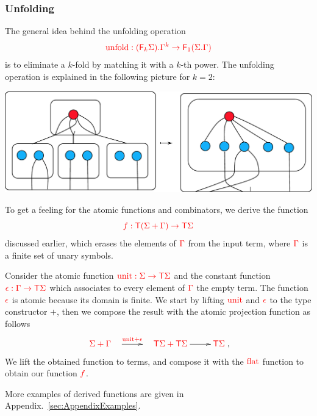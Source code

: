\subsubsection{Unfolding}
The general idea behind the  unfolding operation 
\begin{align*}
{\color{red}{
    {\color{red}{\mathrm{unfold}}}: {\color{red}{({\color{red}{\mathsf F_{k}}}\Sigma) . \Gamma^k}} \to {\color{red}{\mathsf F_{1}}}({\color{red}{\Sigma . \Gamma}})
}}
\end{align*} 
is to eliminate a $k$-fold by matching it with a $k$-th power. 
The unfolding operation is explained in the following picture for $k=2$: 
        \begin{center}
        \includegraphics[scale=.36]{shallow-unfold.pdf}
        \end{center}


\noindent\begin{example}\label{ex:filter} 
 To get a feeling for the atomic functions and combinators, we derive the function
$$ {\color{red}{f:{\color{red}{\mathsf T}}({\color{red}{\Sigma}}+{\color{red}{\Gamma}})\to{\color{red}{\mathsf T}}{\color{red}{\Sigma}}}}$$
discussed earlier, which erases the elements of ${\color{red}{\Gamma}}$ from the input term, where ${\color{red}{\Gamma}}$ is a finite set of unary symbols. 

Consider the atomic function ${\color{red}{{\color{red}{\mathrm{unit}}}:{\color{red}{\Sigma}}\to{\color{red}{\mathsf T}}{\color{red}{\Sigma}}}}$ and the constant function ${\color{red}{\epsilon:{\color{red}{\Gamma}}\to{\color{red}{\mathsf T}}{\color{red}{\Sigma}}}}$ which associates to every element of ${\color{red}{\Gamma}}$ the empty term. The function ${\color{red}{\epsilon}}$ is atomic because its domain is finite. We start by lifting ${\color{red}{{\color{red}{\mathrm{unit}}}}}$ and ${\color{red}{\epsilon}}$ to the type constructor $+$, then we compose the result with the atomic projection function as follows
\begin{align*}
\xymatrix{
    \ranked{\rSigma+\rGamma}\quad \ar[r]^-{\ranked{\unit+\epsilon}} & \quad \ranked{\tmonad\rSigma+\tmonad\rSigma}\ar[r]^-{} &\tmonad\rSigma
},
\end{align*}
We lift the obtained function to terms, and compose it with the ${\color{red}{\mathrm{flat}}}$ function to obtain our function ${\color{red}{f}}$.  
\end{example}

More examples of derived functions are given in Appendix.~\ref{sec:AppendixExamples}.